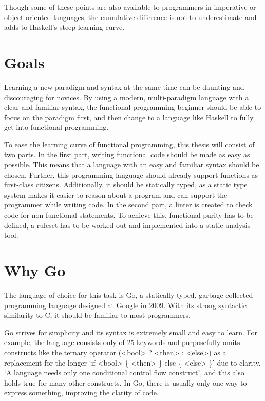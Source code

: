 Though some of these points are also available to programmers in imperative or object-oriented languages, the cumulative difference
is not to underestimate and adds to Haskell's steep learning curve.

\section{Goals}

Learning a new paradigm and syntax at the same time can be daunting and discouraging for novices.
By using a modern, multi-paradigm language with a clear and familiar syntax, the functional
programming beginner should be able to focus on the paradigm first, and then change to a language
like Haskell to fully get into functional programming.

To ease the learning curve of functional programming, this thesis will consist of two parts.
In the first part, writing functional code should be made as easy as possible. This means that
a language with an easy and familiar syntax should be chosen. Further, this programming language
should already support functions as first-class citizens. Additionally, it should be statically
typed, as a static type system makes it easier to reason about a program and can support the
programmer while writing code.
In the second part, a linter is created to check code for non-functional statements. To achieve
this, functional purity has to be defined, a ruleset has to be worked out and implemented into
a static analysis tool.

\section{Why Go}\label{sec:why-go}

The language of choice for this task is Go, a statically typed, garbage-collected programming language
designed at Google in 2009\autocite{golang-publish}. With its strong syntactic similarity to C, it should
be familiar to most programmers.

Go strives for simplicity and its syntax is extremely small and easy to learn. For example, the
language consists only of 25 keywords and purposefully omits constructs like the ternary operator
(<bool> ? <then> : <else>) as a replacement for the longer `if <bool> \{ <then> \} else \{ <else> \}' due
to clarity. `A language needs only one conditional control flow construct'\autocite{go-ternary},
and this also holds true for many other constructs. In Go, there is usually only one way
to express something, improving the clarity of code.

